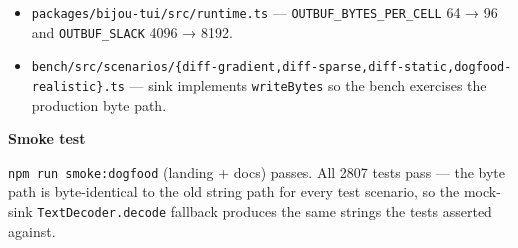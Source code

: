 \begin{itemize}
\item
  \texttt{p\allowbreak{}a\allowbreak{}c\allowbreak{}k\allowbreak{}a\allowbreak{}g\allowbreak{}e\allowbreak{}s\allowbreak{}/\allowbreak{}b\allowbreak{}i\allowbreak{}j\allowbreak{}o\allowbreak{}u\allowbreak{}-\allowbreak{}t\allowbreak{}u\allowbreak{}i\allowbreak{}/\allowbreak{}s\allowbreak{}r\allowbreak{}c\allowbreak{}/\allowbreak{}r\allowbreak{}u\allowbreak{}n\allowbreak{}t\allowbreak{}i\allowbreak{}m\allowbreak{}e\allowbreak{}.\allowbreak{}t\allowbreak{}s} --- \texttt{O\allowbreak{}U\allowbreak{}T\allowbreak{}B\allowbreak{}U\allowbreak{}F\allowbreak{}\_\allowbreak{}B\allowbreak{}Y\allowbreak{}T\allowbreak{}E\allowbreak{}S\allowbreak{}\_\allowbreak{}P\allowbreak{}E\allowbreak{}R\allowbreak{}\_\allowbreak{}C\allowbreak{}E\allowbreak{}L\allowbreak{}L} 64 → 96 and \texttt{O\allowbreak{}U\allowbreak{}T\allowbreak{}B\allowbreak{}U\allowbreak{}F\allowbreak{}\_\allowbreak{}S\allowbreak{}L\allowbreak{}A\allowbreak{}C\allowbreak{}K} 4096 → 8192.
\item
  \texttt{b\allowbreak{}e\allowbreak{}n\allowbreak{}c\allowbreak{}h\allowbreak{}/\allowbreak{}s\allowbreak{}r\allowbreak{}c\allowbreak{}/\allowbreak{}s\allowbreak{}c\allowbreak{}e\allowbreak{}n\allowbreak{}a\allowbreak{}r\allowbreak{}i\allowbreak{}o\allowbreak{}s\allowbreak{}/\allowbreak{}\{\allowbreak{}d\allowbreak{}i\allowbreak{}f\allowbreak{}f\allowbreak{}-\allowbreak{}g\allowbreak{}r\allowbreak{}a\allowbreak{}d\allowbreak{}i\allowbreak{}e\allowbreak{}n\allowbreak{}t\allowbreak{},\allowbreak{}d\allowbreak{}i\allowbreak{}f\allowbreak{}f\allowbreak{}-\allowbreak{}s\allowbreak{}p\allowbreak{}a\allowbreak{}r\allowbreak{}s\allowbreak{}e\allowbreak{},\allowbreak{}d\allowbreak{}i\allowbreak{}f\allowbreak{}f\allowbreak{}-\allowbreak{}s\allowbreak{}t\allowbreak{}a\allowbreak{}t\allowbreak{}i\allowbreak{}c\allowbreak{},\allowbreak{}d\allowbreak{}o\allowbreak{}g\allowbreak{}f\allowbreak{}o\allowbreak{}o\allowbreak{}d\allowbreak{}-\allowbreak{}r\allowbreak{}e\allowbreak{}a\allowbreak{}l\allowbreak{}i\allowbreak{}s\allowbreak{}t\allowbreak{}i\allowbreak{}c\allowbreak{}\}\allowbreak{}.\allowbreak{}t\allowbreak{}s} --- sink implements \texttt{w\allowbreak{}r\allowbreak{}i\allowbreak{}t\allowbreak{}e\allowbreak{}B\allowbreak{}y\allowbreak{}t\allowbreak{}e\allowbreak{}s} so the bench exercises the production byte path.
\end{itemize}

\textbf{Smoke test}

\texttt{n\allowbreak{}p\allowbreak{}m\allowbreak{} \allowbreak{}r\allowbreak{}u\allowbreak{}n\allowbreak{} \allowbreak{}s\allowbreak{}m\allowbreak{}o\allowbreak{}k\allowbreak{}e\allowbreak{}:\allowbreak{}d\allowbreak{}o\allowbreak{}g\allowbreak{}f\allowbreak{}o\allowbreak{}o\allowbreak{}d} (landing + docs) passes. All 2807 tests pass --- the byte path is byte-identical to the old string path for every test scenario, so the mock-sink \texttt{T\allowbreak{}e\allowbreak{}x\allowbreak{}t\allowbreak{}D\allowbreak{}e\allowbreak{}c\allowbreak{}o\allowbreak{}d\allowbreak{}e\allowbreak{}r\allowbreak{}.\allowbreak{}d\allowbreak{}e\allowbreak{}c\allowbreak{}o\allowbreak{}d\allowbreak{}e} fallback produces the same strings the tests asserted against.

